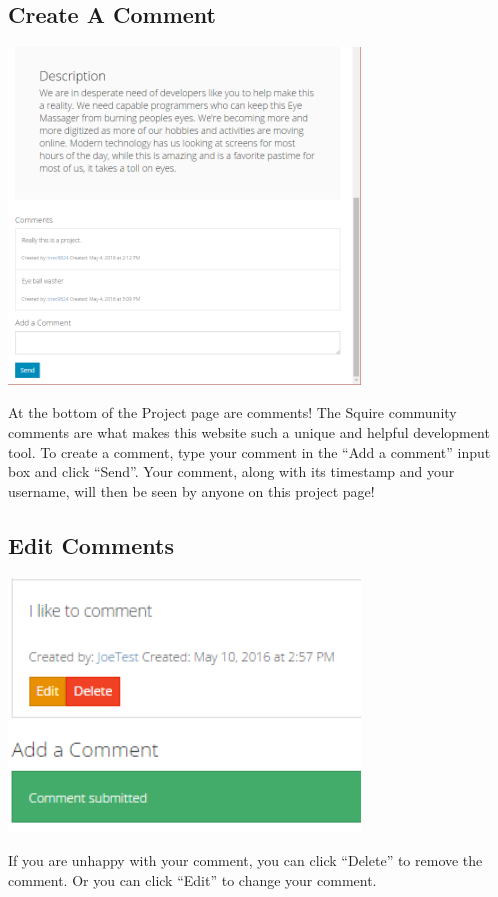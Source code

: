 \documentclass[11pt]{report}
\begin{document}
\subsection{Create A Comment}
	\begin{center}
           \includegraphics[width=0.7\textwidth]{userguide/projectpage_bottom}
    \end{center}
    At the bottom of the Project page are comments! The Squire community comments are what makes this website such a unique and helpful development tool. To create a comment, type your comment in the “Add a comment” input box and click “Send”. Your comment, along with its timestamp and your username, will then be seen by anyone on this project page! 

\subsection{Edit Comments}
	\begin{center}
           \includegraphics[width=0.7\textwidth]{userguide/comment}
    \end{center}
    If you are unhappy with your comment, you can click “Delete” to remove the comment. Or you can click “Edit” to change your comment. 
\end{document}
